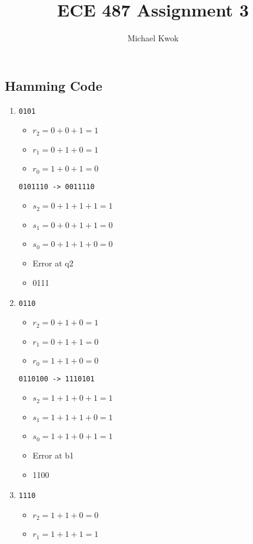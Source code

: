 \documentclass{article}
\title{ECE 487 Assignment 3}
\author{Michael Kwok}
\begin{document}
\maketitle
\begin{multicols}{2}
\subsection*{Hamming Code}
\begin{enumerate}
    \item \verb|0101|
    \begin{itemize}
        \item \(r_2 = 0 + 0 + 1 = 1\)
        \item \(r_1 = 0 + 1 + 0 = 1\)
        \item \(r_0 = 1 + 0 + 1 = 0\)
    \end{itemize}
    \verb|0101110 -> 0011110|
    \begin{itemize}
        \item \(s_2 = 0 + 1 + 1 + 1 = 1\)
        \item \(s_1 = 0 + 0 + 1 + 1 = 0\)
        \item \(s_0 = 0 + 1 + 1 + 0 = 0\)
        \item Error at q2
        \item 0111
    \end{itemize}
    \item \verb|0110|
    \begin{itemize}
        \item \(r_2 = 0 + 1 + 0 = 1\)
        \item \(r_1 = 0 + 1 + 1 = 0\)
        \item \(r_0 = 1 + 1 + 0 = 0\)
    \end{itemize}
    \verb|0110100 -> 1110101|
    \begin{itemize}
        \item \(s_2 = 1 + 1 + 0 + 1 = 1\)
        \item \(s_1 = 1 + 1 + 1 + 0 = 1\)
        \item \(s_0 = 1 + 1 + 0 + 1 = 1\)
        \item Error at b1
        \item 1100
    \end{itemize}
    \item \verb|1110|
    \begin{itemize}
        \item \(r_2 = 1 + 1 + 0 = 0\)
        \item \(r_1 = 1 + 1 + 1 = 1\)

\end{itemize}
\end{enumerate}
\end{multicols}
\end{document}
